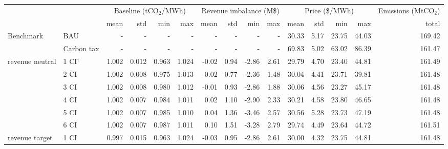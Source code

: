 \begin{tabular}{ll*{13}{r}}
\toprule
              &      & \multicolumn{4}{c}{Baseline (tCO$_{2}$/MWh)} & \multicolumn{4}{c}{Revenue imbalance (M\$)} & \multicolumn{4}{c}{Price (\$/MWh)} & Emissions (MtCO$_{2}$) \\
              &      &                     mean &    std &    min &    max &                    mean &    std &     min &    max &           mean &   std &    min &    max &                  total \\
\midrule
Benchmark & BAU &                        - &      - &      - &      - &                       - &      - &       - &      - &          30.33 &  5.17 &  23.75 &  44.03 &                 169.42 \\
              & Carbon tax &                        - &      - &      - &      - &                       - &      - &       - &      - &          69.83 &  5.02 &  63.02 &  86.39 &                 161.47 \\
revenue neutral & 1 CI$^{\dagger}$ &                    1.002 &  0.012 &  0.963 &  1.024 &                   -0.02 &   0.94 &   -2.86 &   2.61 &          29.79 &  4.70 &  23.40 &  44.81 &                 161.49 \\
              & 2 CI &                    1.002 &  0.008 &  0.975 &  1.013 &                   -0.02 &   0.77 &   -2.36 &   1.48 &          30.04 &  4.41 &  23.71 &  39.81 &                 161.48 \\
              & 3 CI &                    1.002 &  0.008 &  0.980 &  1.012 &                   -0.01 &   0.93 &   -2.86 &   1.88 &          30.06 &  4.56 &  23.27 &  45.17 &                 161.48 \\
              & 4 CI &                    1.002 &  0.007 &  0.984 &  1.011 &                    0.02 &   1.10 &   -2.90 &   2.33 &          30.21 &  4.58 &  23.80 &  46.65 &                 161.48 \\
              & 5 CI &                    1.002 &  0.007 &  0.985 &  1.010 &                    0.04 &   1.36 &   -3.46 &   2.57 &          30.56 &  5.28 &  23.73 &  47.19 &                 161.48 \\
              & 6 CI &                    1.002 &  0.007 &  0.987 &  1.011 &                    0.10 &   1.51 &   -3.28 &   2.79 &          29.74 &  4.49 &  23.64 &  44.72 &                 161.51 \\
revenue target & 1 CI &                    0.997 &  0.015 &  0.963 &  1.024 &                   -0.03 &   0.95 &   -2.86 &   2.61 &          30.00 &  4.32 &  23.75 &  44.81 &                 161.48 \\

\end{tabular}
